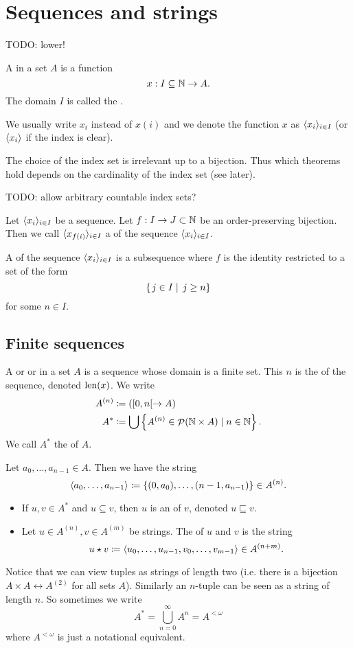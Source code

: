 \section{Sequences and strings}
TODO: lower!
\begin{definition}
A  in a set $A$ is a function
\[ x:I\subseteq\mathbb{N}\to A. \]
The domain $I$ is called the .

We usually write $x_i$ instead of $x(i)$ and we denote the function $x$ as $\langle x_i \rangle_{i\in I}$ (or $\langle x_i \rangle$ if the index is clear).
\end{definition}
The choice of the index set is irrelevant up to a bijection. Thus which theorems hold depends on the cardinality of the index set (see later).

TODO: allow arbitrary countable index sets?

\begin{definition}
Let $\langle x_i \rangle_{i\in I}$ be a sequence. Let $f:I\to J\subset \mathbb{N}$ be an order-preserving bijection. Then we call $\langle x_{f(i)} \rangle_{i\in I}$ a  of the sequence $\langle x_i \rangle_{i\in I}$.

A  of the sequence $\langle x_i \rangle_{i\in I}$ is a subsequence where $f$ is the identity restricted to a set of the form
\[ \left\{\left. j\in I \;\right|\; j\geq n \right\} \]
for some $n\in I$.
\end{definition}

\subsection{Finite sequences}
\begin{definition}
A  or  or  in a set $A$ is a sequence whose domain is a finite set.
This $n$ is the  of the sequence, denoted $\operatorname{len}(x)$. We write
\begin{align*}
A^{(n)} &\coloneqq ([0,n[\to A) \\
A^* &\coloneqq \bigcup\left\{ A^{(n)}\in \mathop{\mathcal{P}}(\mathbb{N}\times A) \;|\;n\in \mathbb{N} \right\}.
\end{align*}
We call $A^*$ the  of $A$.

Let $a_0,\ldots, a_{n-1}\in A$. Then we have the string
\[ \langle a_0,\ldots, a_{n-1}\rangle \coloneqq \{(0,a_0),\ldots, (n-1,a_{n-1})\} \in A^{(n)}. \]
\begin{itemize}
\item If $u,v\in A^*$ and $u\subseteq v$, then $u$ is an  of $v$, denoted $u \sqsubseteq v$.
\item Let $u\in A^{(n)}, v\in A^{(m)}$ be strings. The  of $u$ and $v$ is the string
\[ u\star v \coloneqq \langle u_0,\ldots, u_{n-1},v_0,\ldots, v_{m-1}\rangle \in A^{(n+m)}. \]
\end{itemize}
\end{definition}
Notice that we can view tuples as strings of length two (i.e. there is a bijection $A\times A \leftrightarrow A^{(2)}$ for all sets $A$). Similarly an $n$-tuple can be seen as a string of length $n$. So sometimes we write
\[ A^* = \bigcup^\infty_{n=0}A^n = A^{<\omega}\]
where $A^{<\omega}$ is just a notational equivalent.

